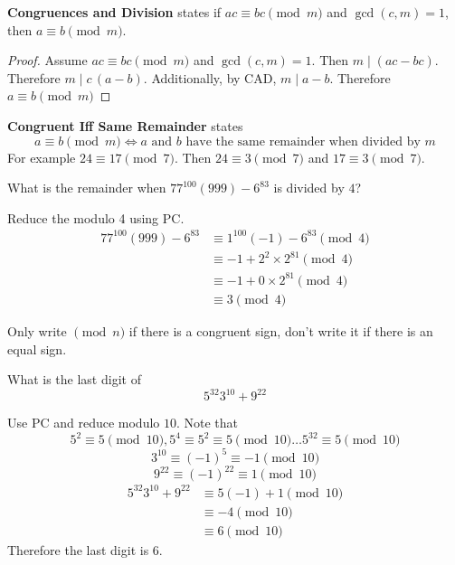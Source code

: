 \documentclass[english, 12pt]{article}
\begin{document}
\begin{defn}[CD]
\textbf{Congruences and Division} states if $ac\equiv bc \pmod m$ and $\gcd(c,m)=1$, then $a \equiv b \pmod m$.
\begin{proof}
Assume $ac\equiv bc \pmod m$ and $\gcd(c,m)=1$. Then $m \mid (ac-bc)$. Therefore $m \mid c\,(a-b)$. Additionally, by CAD, $m \mid a-b$. Therefore $a \equiv b\pmod m$
\end{proof}
\end{defn}
\begin{defn}[CISR]
\textbf{Congruent Iff Same Remainder} states\\
\[a \equiv b \pmod m \iff a \text{ and } b \text{ have the same remainder when divided by } m \]
For example $24 \equiv 17 \pmod 7$. Then $24 \equiv 3 \pmod 7$ and $17 \equiv 3 \pmod 7$.
\end{defn}
\begin{exmp}
What is the remainder when $77^{100}(999)-6^{83}$ is divided by $4$?
\begin{sol}
Reduce the modulo 4 using PC.
\begin{align*}
77^{100}(999)-6^{83} &\equiv 1^{100}(-1)-6^{83} \pmod 4\\
&\equiv -1 +2^2\times 2^{81} \pmod 4\\
&\equiv -1 + 0\times 2^{81} \pmod 4\\
&\equiv 3 \pmod 4
\end{align*}
\end{sol}
\end{exmp}
\begin{note}
Only write $\pmod n$ if there is a congruent sign, don't write it if there is an equal sign.
\end{note}
\begin{exmp}
What is the last digit of 
\[5^{32} 3^{10} + 9^{22} \]
\begin{sol}
Use PC and reduce modulo $10$.
Note that
\[5^2 \equiv 5 \pmod{10}, 5^4 \equiv 5^2 \equiv 5 \pmod{10}\dots 5^{32} \equiv 5 \pmod{10} \]
\[3^{10} \equiv (-1)^5 \equiv -1 \pmod{10}\]
\[9^{22} \equiv (-1)^{22} \equiv 1 \pmod{10}\]
\begin{align*}
5^{32} 3^{10} + 9^{22} &\equiv5(-1) + 1 \pmod{10}\\
&\equiv -4 \pmod{10}\\
&\equiv 6 \pmod{10}
\end{align*}
Therefore the last digit is $6$.
\end{sol}
\end{exmp}
\end{document}
